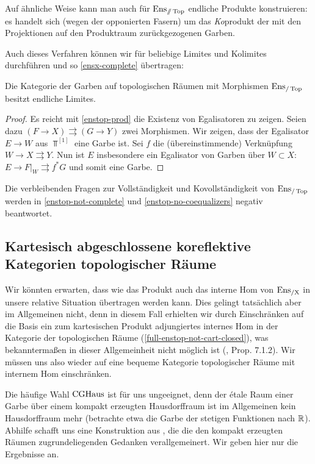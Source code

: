 \begin{bem}
  Auf ähnliche Weise kann man auch für $\operatorname{Ens}_{\mathbin{/\mkern-6mu/} \operatorname{Top}}$ endliche
  Produkte konstruieren: es handelt sich (wegen der opponierten
  Fasern) um das \emph{Ko}produkt der mit den Projektionen auf den
  Produktraum zurückgezogenen Garben.
\end{bem}
Auch dieses Verfahren können wir für beliebige Limites und Kolimites
durchführen und so \ref{ensx-complete} übertragen:
\begin{satz} \label{enstop-fin-complete}
  Die Kategorie der Garben auf topologischen Räumen mit Morphismen
  $\operatorname{Ens}_{/\operatorname{Top}}$ besitzt endliche Limites.
\end{satz}
\begin{proof}
  Es reicht mit \ref{enstop-prod} die Existenz von Egalisatoren zu
  zeigen. Seien dazu $(F \to X) \rightrightarrows (G \to Y)$ zwei
  Morphismen. Wir zeigen, dass der Egalisator $E \to W$ aus
  $\Top^{[1]}$ eine Garbe ist. Sei $f$ die (übereinstimmende)
  Verknüpfung $W \to X \rightrightarrows Y$. Nun ist $E$ insbesondere
  ein Egalisator von Garben über $W \subset X$: $E \to F|_W
  \rightrightarrows f^* G$ und somit eine Garbe.
\end{proof}
\begin{bem}
  Die verbleibenden Fragen zur Vollständigkeit und Kovollständigkeit
  von $\operatorname{Ens}_{/\operatorname{Top}}$ werden in \ref{enstop-not-complete} und
  \ref{enstop-no-coequalizers} negativ beantwortet.
\end{bem}

\subsection{Kartesisch abgeschlossene koreflektive Kategorien topologischer Räume}

Wir könnten erwarten, dass wie das Produkt auch das interne Hom von
$\operatorname{Ens_{/X}}$ in unsere relative Situation übertragen werden kann. Dies
gelingt tatsächlich aber im Allgemeinen nicht, denn in diesem Fall
erhielten wir durch Einschränken auf die Basis ein zum kartesischen
Produkt adjungiertes internes Hom in der Kategorie der topologischen
Räume (\ref{full-enstop-not-cart-closed}), was bekanntermaßen in
dieser Allgemeinheit nicht möglich ist (\cite{Borceux},
Prop. 7.1.2). Wir müssen uns also wieder auf eine bequeme Kategorie
topologischer Räume mit internem Hom einschränken.

Die häufige Wahl $\operatorname{CGHaus}$ ist für uns ungeeignet, denn der étale Raum
einer Garbe über einem kompakt erzeugten Hausdorffraum ist im
Allgemeinen kein Hausdorffraum mehr (betrachte etwa die Garbe der
stetigen Funktionen nach $\mathbb{R}$). Abhilfe schafft uns eine Konstruktion
aus \cite{Vogt}, die die den kompakt erzeugten Räumen
zugrundeliegenden Gedanken verallgemeinert. Wir geben hier nur die
Ergebnisse an.

